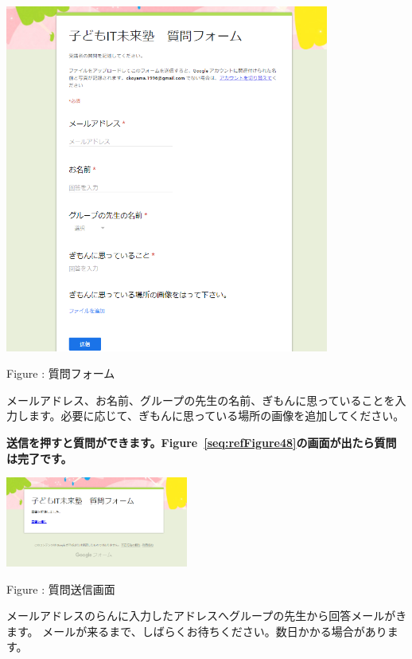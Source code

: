 \documentclass[a4paper,12pt]{jarticle}
\begin{document}
\centering
\begin{minipage}{\textwidth}
  {\upshape
    \includegraphics[width=0.8\textwidth]{textbook-img246.png}
    \flushleft

    \bigskip
    Figure {\theFigure\label{seq:refFigure47}}: 質問フォーム}
\end{minipage}
\flushleft

\bigskip

メールアドレス、お名前、グループの先生の名前、ぎもんに思っていることを入力します。必要に応じて、ぎもんに思っている場所の画像を追加してください。

{\bfseries
送信\textmd{を押すと質問ができます。Figure~\ref{seq:refFigure48}の画面が出たら質問は完了です。}}



\centering
\begin{minipage}{\textwidth}
  {\upshape
    \includegraphics[width=0.45\textwidth]{textbook-img247.png}
    \flushleft

    \bigskip
    Figure {\theFigure\label{seq:refFigure48}}: 質問送信画面}
\end{minipage}
\flushleft
メールアドレスのらんに入力したアドレスへグループの先生から回答メールがきます。
メールが来るまで、しばらくお待ちください。数日かかる場合があります。
\end{document}

